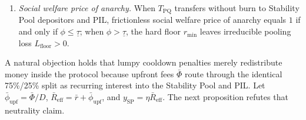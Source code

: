 \begin{theorem}
\begin{enumerate}[label=(\roman*), leftmargin=2.2em, itemsep=2pt]
\begin{equation}
\end{equation}
giving the universal upper bound (tight as $\E[\tau] \to \underline{\tau}$)
\begin{equation}\label{eq:poa_het}
1 \le \mathrm{PoA}_{\mathrm{borr}} = \frac{E_{\mathrm{PQ}} - D r_{\min}}{C_{\mathrm{FB}}} \le \frac{\E[\tau] - \phi}{\underline{\tau} - \phi}\cdot \frac{D}{\E[\min(Q, D)]} \le \frac{\bar{\tau} - \phi}{\underline{\tau} - \phi}\cdot \frac{D}{\E[\min(Q, D)]}.
\end{equation}
\item \emph{Social welfare price of anarchy.} When $T_{\mathrm{PQ}}$ transfers without burn to Stability Pool depositors and PIL, frictionless social welfare price of anarchy equals $1$ if and only if $\phi \le \underline{\tau}$; when $\phi > \underline{\tau}$, the hard floor $r_{\min}$ leaves irreducible pooling loss $L_{\mathrm{floor}} > 0$.
\end{enumerate}
\end{theorem}

A natural objection holds that lumpy cooldown penalties merely redistribute money inside the protocol because upfront fees $\bar{\Phi}$ route through the identical 75\%/25\% split as recurring interest into the Stability Pool and PIL. Let $\bar{\phi}_{\mathrm{upf}} = \bar{\Phi}/D$, $\bar{R}_{\mathrm{eff}} = \bar{r} + \bar{\phi}_{\mathrm{upf}}$, and $y_{\mathrm{SP}} = \eta \bar{R}_{\mathrm{eff}}$. The next proposition refutes that neutrality claim.

